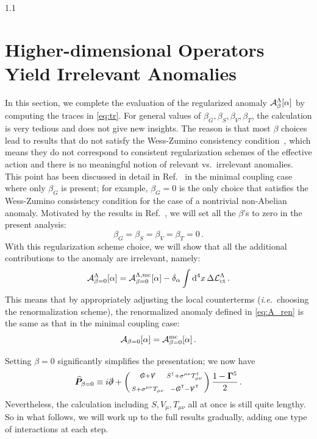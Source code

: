 \documentclass[a4paper,12pt]{article}
\def\L{{\cal L}}
\def\Acal{{\cal A}}
\def\ie{\emph{i.e.}}
\def\mat#1{\boldsymbol{#1}}
\def\T{\textsf{T}}
\def\X{\mat{\widehat{P}}}
\def\G5{\mat{\Gamma}^5}
\def\Gsl{\slashed{G}}
\def\pdsl{\slashed\partial}
\def\Vsl{\slashed{V}}
\begin{document}
\begin{spacing}{1.1}
\section{Higher-dimensional Operators Yield Irrelevant Anomalies}
\label{sec:Irrelevance}

In this section, we complete the evaluation of the regularized anomaly $\Acal_\beta^\Lambda [\alpha]$ by computing the traces in \cref{eq:tr}. For general values of $\beta_G, \beta_S, \beta_V, \beta_T$, the calculation is very tedious and does not give new insights.  The reason is that most $\beta$ choices lead to results that do not satisfy the Wess-Zumino consistency condition~\cite{Wess:1971yu}, which means they do not correspond to consistent regularization schemes of the effective action and there is no meaningful notion of relevant vs.\ irrelevant anomalies. This point has been discussed in detail in Ref.~\cite{Paper1} in the minimal coupling case where only $\beta_G$ is present; for example, $\beta_G=0$ is the only choice that satisfies the Wess-Zumino consistency condition for the case of a nontrivial non-Abelian anomaly. Motivated by the results in Ref.~\cite{Paper1}, we will set all the $\beta$'s to zero in the present analysis:
\begin{equation}
\beta_G = \beta_S = \beta_V = \beta_T = 0 \,.
\end{equation}
With this regularization scheme choice, we will show that all the additional contributions to the anomaly are irrelevant, namely:
\begin{equation}
\Acal_{\beta=0}^\Lambda[\alpha] = \Acal_{\beta=0}^{\Lambda,\text{mc}}[\alpha] - \delta_\alpha \int \dd^4x\, \Delta\L_\text{ct}^\Lambda \,.
\label{eq:irrelevant}
\end{equation}
This means that by appropriately adjusting the local counterterms (\ie\ choosing the renormalization scheme), the renormalized anomaly defined in \cref{eq:A_ren} is the same as that in the minimal coupling case:
\begin{equation}
\Acal_{\beta=0}[\alpha] = \Acal_{\beta=0}^{\text{mc}}[\alpha] \,.
\end{equation}

Setting $\beta=0$ significantly simplifies the presentation; we now have
\begin{align}
\X_{\beta=0} \equiv i\pdsl + \left(\begin{smallmatrix}
\Gsl + \Vsl & S^\dagger + \sigma^{\mu\nu} T^\dagger_{\mu\nu} \\[4pt]
 S + \sigma^{\mu\nu} T_{\mu\nu} & -\slashed{G}^\T - \slashed{V}^\T
\end{smallmatrix}\right) \frac{1-\G5}{2} \,.
\label{eqn:X0}
\end{align}
Nevertheless, the calculation including $S, V_\mu, T_{\mu\nu}$ all at once is still quite lengthy. So in what follows, we will work up to the full results gradually, adding one type of interactions at each step.



\end{spacing}
\end{document}
